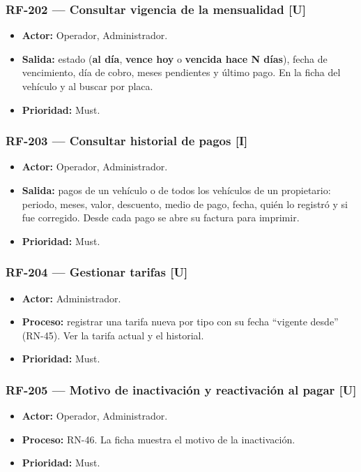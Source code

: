 \subsubsection{RF-202 — Consultar vigencia de la mensualidad [U]}
\begin{itemize}
  \item \textbf{Actor:} Operador, Administrador.
  \item \textbf{Salida:} estado (\textbf{al día}, \textbf{vence hoy} o \textbf{vencida hace N días}), fecha de vencimiento, día de cobro, meses pendientes y último pago. En la ficha del vehículo y al buscar por placa.
  \item \textbf{Prioridad:} Must.
\end{itemize}

\subsubsection{RF-203 — Consultar historial de pagos [I]}
\begin{itemize}
  \item \textbf{Actor:} Operador, Administrador.
  \item \textbf{Salida:} pagos de un vehículo o de todos los vehículos de un propietario: periodo, meses, valor, descuento, medio de pago, fecha, quién lo registró y si fue corregido. Desde cada pago se abre su factura para imprimir.
  \item \textbf{Prioridad:} Must.
\end{itemize}

\subsubsection{RF-204 — Gestionar tarifas [U]}
\begin{itemize}
  \item \textbf{Actor:} Administrador.
  \item \textbf{Proceso:} registrar una tarifa nueva por tipo con su fecha ``vigente desde'' (RN-45). Ver la tarifa actual y el historial.
  \item \textbf{Prioridad:} Must.
\end{itemize}

\subsubsection{RF-205 — Motivo de inactivación y reactivación al pagar [U]}
\begin{itemize}
  \item \textbf{Actor:} Operador, Administrador.
  \item \textbf{Proceso:} RN-46. La ficha muestra el motivo de la inactivación.
  \item \textbf{Prioridad:} Must.
\end{itemize}

